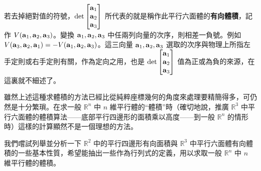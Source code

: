 若去掉絕對值的符號，$\det \begin{bmatrix} \boldsymbol{\mathbf{a}}_1 \\ \boldsymbol{\mathbf{a}}_2 \\ \boldsymbol{\mathbf{a}}_3 \end{bmatrix}$ 所代表的就是稱作此平行六面體的\textbf{有向體積}，記作 $V(\boldsymbol{\mathbf{a}}_1, \boldsymbol{\mathbf{a}}_2, \boldsymbol{\mathbf{a}}_3)$。變換 $\boldsymbol{\mathbf{a}}_1, \boldsymbol{\mathbf{a}}_2, \boldsymbol{\mathbf{a}}_3$ 中任兩列向量的次序，則相差一負號。例如 $V(\boldsymbol{\mathbf{a}}_3, \boldsymbol{\mathbf{a}}_2, \boldsymbol{\mathbf{a}}_1) = -V(\boldsymbol{\mathbf{a}}_1, \boldsymbol{\mathbf{a}}_2, \boldsymbol{\mathbf{a}}_3)$。這三向量 $\boldsymbol{\mathbf{a}}_1, \boldsymbol{\mathbf{a}}_2, \boldsymbol{\mathbf{a}}_3$ 選取的次序與物理上所指左手定則或右手定則有關，作為定向之用，也是 $\det \begin{bmatrix} \boldsymbol{\mathbf{a}}_1 \\ \boldsymbol{\mathbf{a}}_2 \\ \boldsymbol{\mathbf{a}}_3 \end{bmatrix}$ 值為正或為負的來源，在這裏就不細述了。

雖然上述這種求體積的方法已經比從純粹座標幾何的角度來處理要精簡得多，可仍然是十分繁瑣。在求一般 $\mathbb{R}^n$ 中 $n$ 維平行體的“體積”時（確切地說，推廣 $\mathbb{R}^3$ 中平行六面體的體積算法——底部平行四邊形的面積乘以高度——到一般 $\mathbb{R}^n$ 的情形時）這樣的計算顯然不是一個理想的方法。

我們嚐試列舉並分析一下 $\mathbb{R}^2$ 中的平行四邊形有向面積與 $\mathbb{R}^3$ 中平行六面體有向體積的一些基本性質，希望能抽出一些作為行列式的定義，用以求取一般 $\mathbb{R}^n$ 中 $n$ 維平行體的體積。

